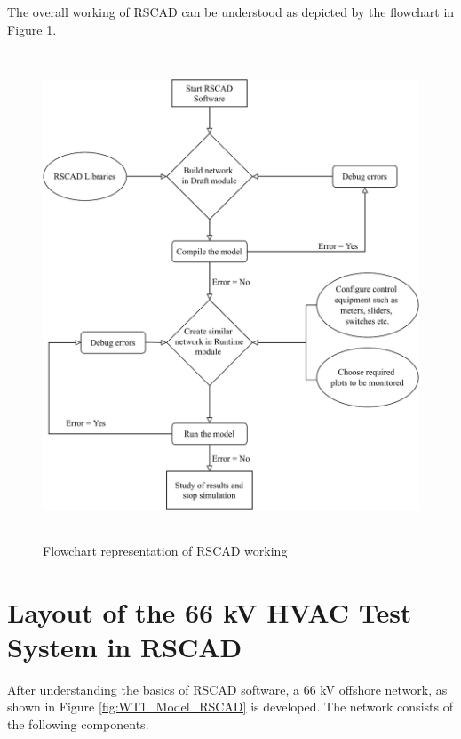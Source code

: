 The overall working of RSCAD can be understood as depicted by the flowchart in Figure \ref{fig:RSCAD_Flowchart}.
\begin{figure}[H]
\centering
    \includegraphics[height = 14.5cm,width = 12.5cm]{Diagrams/Chapter_3/RSCAD_Flowchart.pdf}
    \caption{Flowchart representation of RSCAD working}
    \label{fig:RSCAD_Flowchart}
\end{figure}

\section{Layout of the 66 kV HVAC Test System in RSCAD}\label{RSCAD_ACsourcemodel}\label{WT1_ACsource_RSCAD_Test_Layout}
After understanding the basics of RSCAD software, a 66 kV offshore network, as shown in Figure \ref{fig:WT1_Model_RSCAD} is developed. The network consists of the following components.

